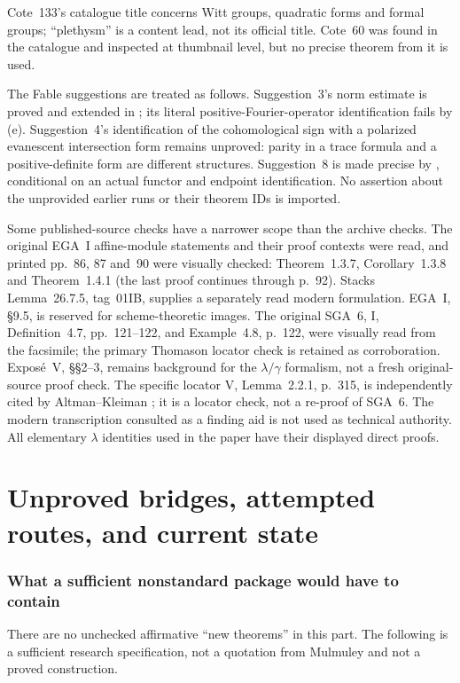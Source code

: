 Cote~133's catalogue title concerns Witt groups, quadratic forms and formal groups; ``plethysm'' is a content lead, not its official title. Cote~60 was found in the catalogue and inspected at thumbnail level, but no precise theorem from it is used.

The Fable suggestions are treated as follows. Suggestion~3's norm estimate is proved and extended in ; its literal positive-Fourier-operator identification fails by (e). Suggestion~4's identification of the cohomological sign with a polarized evanescent intersection form remains unproved: parity in a trace formula and a positive-definite form are different structures. Suggestion~8 is made precise by , conditional on an actual functor and endpoint identification. No assertion about the unprovided earlier runs or their theorem IDs is imported.

Some published-source checks have a narrower scope than the archive checks.
The original EGA~I affine-module statements and their proof
contexts were read, and printed pp.~86, 87 and~90 were visually
checked: Theorem~1.3.7, Corollary~1.3.8 and Theorem~1.4.1
(the last proof continues through p.~92). Stacks Lemma~26.7.5,
tag~01IB, supplies a separately read modern formulation.
EGA~I, \S9.5, is reserved for scheme-theoretic images.
The original SGA~6, I, Definition~4.7, pp.~121--122, and
Example~4.8, p.~122, were visually read from the facsimile;
the primary Thomason locator check
\cite[\S3.1, pp.~8--9]{ThomasonPerfect} is retained as
corroboration. Expos\'e~V, \S\S2--3, remains background for
the $\lambda/\gamma$ formalism, not a fresh original-source
proof check. The specific locator V, Lemma~2.2.1, p.~315, is independently cited by Altman--Kleiman \cite[\S2.10]{AK}; it is a locator check, not a re-proof of SGA~6. The modern transcription consulted as a finding aid is not used as technical authority. All elementary $\lambda$ identities used in the paper have their displayed direct proofs.

\part{Unproved bridges, attempted routes, and current state}
\section{What a sufficient nonstandard package would have to contain}\label{sec:gates}
There are no unchecked affirmative ``new theorems'' in this part. The following is a sufficient research specification, not a quotation from Mulmuley and not a proved construction.

